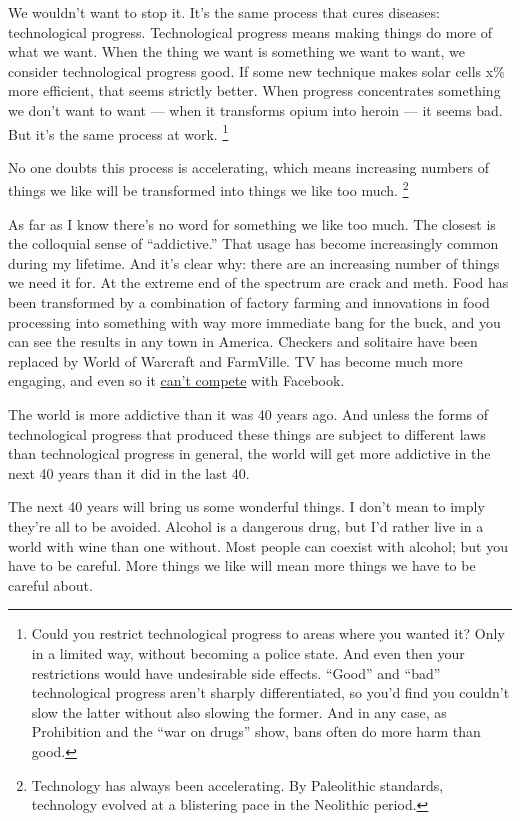 \documentclass[12pt]{book}
\begin{document}
We wouldn't want to stop it. It's the same process that cures diseases:
technological progress. Technological progress means making things do
more of what we want. When the thing we want is something we want to
want, we consider technological progress good. If some new technique
makes solar cells x\% more efficient, that seems strictly better. When
progress concentrates something we don't want to want --- when it
transforms opium into heroin --- it seems bad. But it's the same process
at work. \footnote{Could you restrict technological progress to areas where you
wanted it? Only in a limited way, without becoming a police state. And
even then your restrictions would have undesirable side effects.
``Good'' and ``bad'' technological progress aren't sharply
differentiated, so you'd find you couldn't slow the latter without also
slowing the former. And in any case, as Prohibition and the ``war on
drugs'' show, bans often do more harm than good.}

No one doubts this process is accelerating, which means increasing
numbers of things we like will be transformed into things we like too
much. \footnote{Technology has always been accelerating. By Paleolithic
standards, technology evolved at a blistering pace in the Neolithic
period.}

As far as I know there's no word for something we like too much. The
closest is the colloquial sense of ``addictive.'' That usage has become
increasingly common during my lifetime. And it's clear why: there are an
increasing number of things we need it for. At the extreme end of the
spectrum are crack and meth. Food has been transformed by a combination
of factory farming and innovations in food processing into something
with way more immediate bang for the buck, and you can see the results
in any town in America. Checkers and solitaire have been replaced by
World of Warcraft and FarmVille. TV has become much more engaging, and
even so it \href{convergence.html}{can't compete} with Facebook.

The world is more addictive than it was 40 years ago. And unless the
forms of technological progress that produced these things are subject
to different laws than technological progress in general, the world will
get more addictive in the next 40 years than it did in the last 40.

The next 40 years will bring us some wonderful things. I don't mean to
imply they're all to be avoided. Alcohol is a dangerous drug, but I'd
rather live in a world with wine than one without. Most people can
coexist with alcohol; but you have to be careful. More things we like
will mean more things we have to be careful about.
\end{document}
